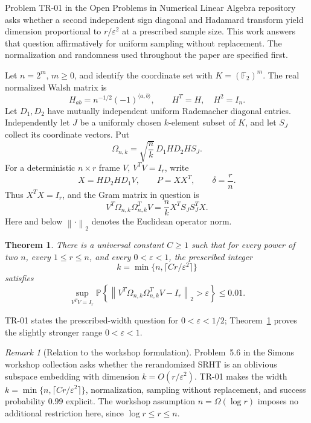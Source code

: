 \documentclass[11pt]{article}
\newtheorem{theorem}{Theorem}
\theoremstyle{definition}
\theoremstyle{remark}
\newtheorem*{remark}{Remark}
\theoremstyle{plain}
\newcommand{\Prob}{\mathbb P}
\newcommand{\F}{\mathbb F}
\newcommand{\norm}[1]{\left\lVert#1\right\rVert_2}
\begin{document}
Problem TR-01 in the Open Problems in Numerical Linear Algebra repository
\cite{tr01} asks whether a second independent sign diagonal and Hadamard
transform yield dimension proportional to $r/\varepsilon^2$ at a prescribed
sample size. This work answers that question affirmatively for uniform
sampling without replacement. The normalization and randomness used
throughout the paper are specified first.

Let \(n=2^m\), \(m\ge0\), and identify the coordinate set with
\(K=(\F_2)^m\). The real normalized Walsh matrix is
\[
 H_{ab}=n^{-1/2}(-1)^{\langle a,b\rangle},\qquad H^T=H,\quad H^2=I_n.
\]
Let \(D_1,D_2\) have mutually independent uniform Rademacher diagonal
entries. Independently let \(J\) be a uniformly chosen \(k\)-element
subset of \(K\), and let \(S_J\) collect its coordinate vectors. Put
\[
 \Omega_{n,k}=\sqrt{\frac nk}\,D_1HD_2HS_J.
\]
For a deterministic \(n\times r\) frame \(V\), \(V^TV=I_r\), write
\[
 X=HD_2HD_1V,\qquad P=XX^T,\qquad \delta=\frac rn.
\]
Thus \(X^TX=I_r\), and the Gram matrix in question is
\begin{equation}\label{eq:sampled-gram}
 V^T\Omega_{n,k}\Omega_{n,k}^TV
   =\frac nk X^T S_JS_J^T X.
\end{equation}
Here and below $\norm{\cdot}$ denotes the Euclidean operator norm.

\begin{theorem}\label{thm:main}
There is a universal constant \(C\ge1\) such that for every power of
two \(n\), every \(1\le r\le n\), and every \(0<\varepsilon<1\), the
prescribed integer
\begin{equation}\label{eq:prescribed-width}
 k=\min\{n,\lceil Cr/\varepsilon^2\rceil\}
\end{equation}
satisfies
\begin{equation}\label{eq:main-bound}
 \sup_{V^TV=I_r}
 \Prob\!\left\{\norm{V^T\Omega_{n,k}\Omega_{n,k}^TV-I_r}
                      >\varepsilon\right\}\le0.01.
\end{equation}
\end{theorem}

TR-01 states the prescribed-width question for $0<\varepsilon<1/2$;
Theorem~\ref{thm:main} proves the slightly stronger range $0<\varepsilon<1$.

\begin{remark}[Relation to the workshop formulation]
Problem~5.6 in the Simons workshop collection
\cite[Definitions~5.1 and~5.3, Problem~5.6]{workshop} asks whether the
rerandomized SRHT is an oblivious subspace embedding with dimension
$k=O(r/\varepsilon^2)$. TR-01 makes the width
$k=\min\{n,\lceil Cr/\varepsilon^2\rceil\}$, normalization, sampling
without replacement, and success probability $0.99$ explicit.
The workshop assumption $n=\Omega(\log r)$ imposes no additional
restriction here, since $\log r\le r\le n$.
\end{remark}
\end{document}
